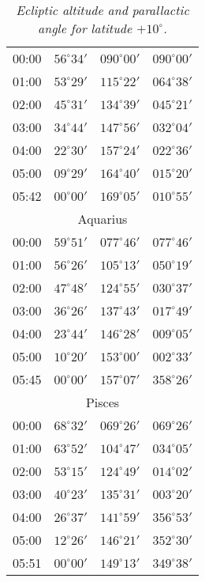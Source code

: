 \begin{table}
\begin{Parallel}{}{}
{{\begin{tabular}{l|lll}
00:00 & $56^\circ 34'$ & $090^\circ 00'$& $090^\circ 00'$ \\
01:00 & $53^\circ 29'$ & $115^\circ 22'$& $064^\circ 38'$ \\
02:00 & $45^\circ 31'$ & $134^\circ 39'$& $045^\circ 21'$ \\
03:00 & $34^\circ 44'$ & $147^\circ 56'$& $032^\circ 04'$ \\
04:00 & $22^\circ 30'$ & $157^\circ 24'$& $022^\circ 36'$ \\
05:00 & $09^\circ 29'$ & $164^\circ 40'$& $015^\circ 20'$ \\
05:42 & $00^\circ 00'$ & $169^\circ 05'$& $010^\circ 55'$ \\
\multicolumn{4}{c}{Aquarius}\\
00:00 & $59^\circ 51'$ & $077^\circ 46'$& $077^\circ 46'$ \\
01:00 & $56^\circ 26'$ & $105^\circ 13'$& $050^\circ 19'$ \\
02:00 & $47^\circ 48'$ & $124^\circ 55'$& $030^\circ 37'$ \\
03:00 & $36^\circ 26'$ & $137^\circ 43'$& $017^\circ 49'$ \\
04:00 & $23^\circ 44'$ & $146^\circ 28'$& $009^\circ 05'$ \\
05:00 & $10^\circ 20'$ & $153^\circ 00'$& $002^\circ 33'$ \\
05:45 & $00^\circ 00'$ & $157^\circ 07'$& $358^\circ 26'$ \\
\multicolumn{4}{c}{Pisces}\\
00:00 & $68^\circ 32'$ & $069^\circ 26'$& $069^\circ 26'$ \\
01:00 & $63^\circ 52'$ & $104^\circ 47'$& $034^\circ 05'$ \\
02:00 & $53^\circ 15'$ & $124^\circ 49'$& $014^\circ 02'$ \\
03:00 & $40^\circ 23'$ & $135^\circ 31'$& $003^\circ 20'$ \\
04:00 & $26^\circ 37'$ & $141^\circ 59'$& $356^\circ 53'$ \\
05:00 & $12^\circ 26'$ & $146^\circ 21'$& $352^\circ 30'$ \\
05:51 & $00^\circ 00'$ & $149^\circ 13'$& $349^\circ 38'$ \\
\end{tabular}
}}
\end{Parallel}
\caption{\em Ecliptic altitude and parallactic angle for latitude $+10^\circ$.}\label{tscorp}
\end{table}

